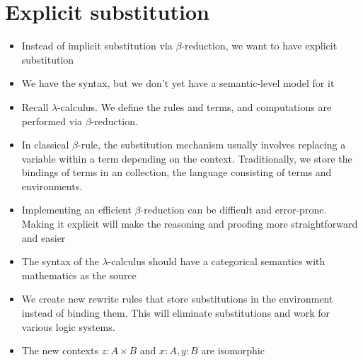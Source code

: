 \documentclass[11pt]{article}
\begin{document}
\section{Explicit substitution}
\begin{itemize}
    \item Instead of implicit substitution via $\beta$-reduction, we want to have explicit substitution
    \item We have the syntax, but we don't yet have a semantic-level model for it
    \item Recall $\lambda$-calculus. We define the rules and terms, and computations are performed via $\beta$-reduction.
    \item In classical $\beta$-rule, the substitution mechanism usually involves replacing a variable within a term depending on the context. Traditionally, we store the bindings of terms in an collection, the language consisting of terms and environments.
    \item Implementing an efficient $\beta$-reduction can be difficult and error-prone. Making it explicit will make the reasoning and proofing more straightforward and easier
    \item The syntax of the $\lambda$-calculus should have a categorical semantics with mathematics as the source
    \item We create new rewrite rules that store substitutions in the environment instead of binding them. This will eliminate substitutions and work for various logic systems.
    \item The new contexts $z : A \times B$ and $x : A, y : B$ are isomorphic
\end{itemize}
\end{document}
